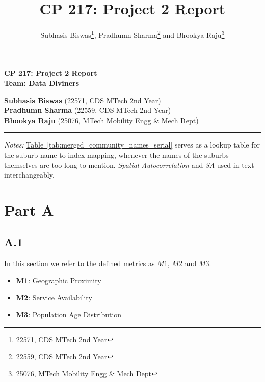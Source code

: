 \documentclass[
	a4paper, %
	10pt, %
	unnumberedsections, %
	twoside, %
]{LTJournalArticle}
\title{CP 217: Project 2 Report} %
\author{%
	Subhasis Biswas\thanks{22571, CDS MTech 2nd Year},  Pradhumn Sharma\thanks{22559, CDS MTech 2nd Year} and Bhookya Raju\thanks{25076, MTech Mobility Engg \& Mech Dept}
}
\begin{document}

\begin{center}
  \textbf{\Large CP 217: Project 2 Report} \\[1em]
  \textbf{Team: Data Diviners} \\[2em]
\end{center}
\vspace{-8pt}
\textbf{Subhasis Biswas} \> (22571, CDS MTech 2nd Year) \\
\textbf{Pradhumn Sharma} \> (22559, CDS MTech 2nd Year) \\
\textbf{Bhookya Raju} \> (25076, MTech Mobility Engg \& Mech Dept) \\

\vspace{-5pt}
\hrule\leavevmode


\vspace{-3pt}

\begin{small}
  \textit{Notes:} \hyperref[tab:merged_community_names_serial]{Table~\ref{tab:merged_community_names_serial}} serves as a lookup table for the suburb name-to-index mapping, whenever the names of the suburbs themselves are too long to mention. \textit{Spatial Autocorrelation} and \textit{SA} used in text interchangeably.
\end{small}

\section{Part A}



\subsection{A.1}

In this section we refer to the defined metrics as $M1$, $M2$ and $M3$.
\begin{itemize}
    \item \textbf{M1}: Geographic Proximity
    \item \textbf{M2}: Service Availability
    \item \textbf{M3}: Population Age Distribution
\end{itemize}
\end{document}
